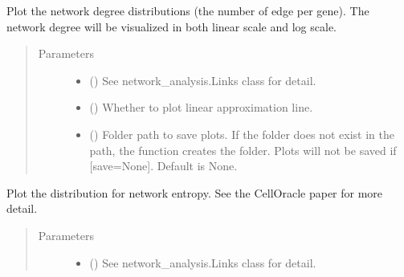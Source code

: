 \documentclass[letterpaper,10pt,english]{sphinxmanual}
\begin{document}
\begin{fulllineitems}
\begin{fulllineitems}
\label{\detokenize{modules/celloracle:celloracle.Links.plot_degree_distributions}}
Plot the network degree distributions (the number of edge per gene).
The network degree will be visualized in both linear scale and log scale.
\begin{quote}\begin{description}
\item[{Parameters}] \leavevmode\begin{itemize}
\item {} 
 ({\hyperref[\detokenize{modules/celloracle:celloracle.Links}]{}}) \textendash{} See network\_analysis.Links class for detail.

\item {} 
 () \textendash{} Whether to plot linear approximation line.

\item {} 
 () \textendash{} Folder path to save plots. If the folder does not exist in the path, the function creates the folder.
Plots will not be saved if {[}save=None{]}. Default is None.

\end{itemize}

\end{description}\end{quote}

\end{fulllineitems}


\begin{fulllineitems}
\label{\detokenize{modules/celloracle:celloracle.Links.plot_network_entropy_distributions}}
Plot the distribution for network entropy.
See the CellOracle paper for more detail.
\begin{quote}\begin{description}
\item[{Parameters}] \leavevmode\begin{itemize}
\item {} 
 () \textendash{} See network\_analysis.Links class for detail.


\end{itemize}
\end{description}
\end{quote}
\end{fulllineitems}
\end{fulllineitems}
\end{document}
